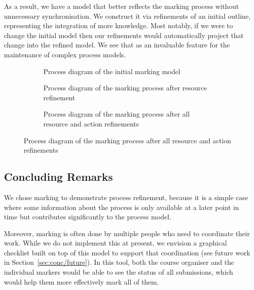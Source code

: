 \documentclass[class=smolathesis,crop=false]{standalone}
\begin{document}
As a result, we have a model that better reflects the marking process without unnecessary synchronisation.
We construct it via refinements of an initial outline, representing the integration of more knowledge.
Most notably, if we were to change the initial model then our refinements would automatically project that change into the refined model.
We see that as an invaluable feature for the maintenance of complex process models.

\begin{figure}
  \centering
  \begin{subfigure}{\textwidth}
    \centering
    
    \caption{Process diagram of the initial marking model}
    \label{fig:marking-init}
  \end{subfigure}
  \par\bigskip
  \begin{subfigure}{\textwidth}
    \centering
    
    \caption{Process diagram of the marking process after resource refinement}
    \label{fig:marking-res}
  \end{subfigure}
  \par\bigskip
  \begin{subfigure}{\textwidth}
    \centering
    
    \caption{Process diagram of the marking process after all resource and action refinements}
    \label{fig:marking-fin}
  \end{subfigure}
\end{figure}

\subsection{Concluding Remarks}
\label{sec:cases/marking/conc}

We chose marking to demonstrate process refinement, because it is a simple case where some information about the process is only available at a later point in time but contributes significantly to the process model.

Moreover, marking is often done by multiple people who need to coordinate their work.
While we do not implement this at present, we envision a graphical checklist built on top of this model to support that coordination (see future work in Section~\ref{sec:conc/future}).
In this tool, both the course organiser and the individual markers would be able to see the status of all submissions, which would help them more effectively mark all of them.
\end{document}
